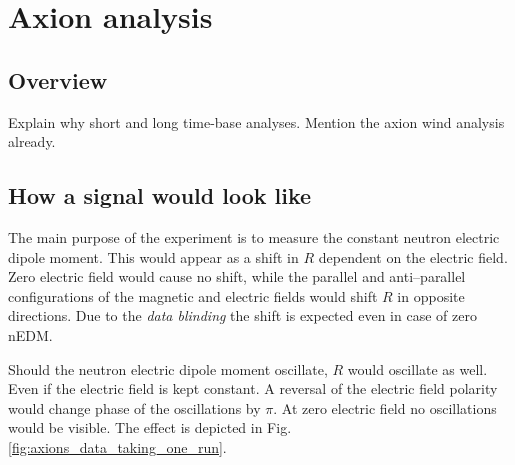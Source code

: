 \chapter{Axion analysis}
\label{ch:nedm-at-psi-apparatus}


\section{Overview}
Explain why short and long time-base analyses. Mention the axion wind analysis already.





\section{How a signal would look like}
The main purpose of the experiment is to measure the constant neutron electric dipole moment. This would appear as a shift in $R$ dependent on the electric field. Zero electric field would cause no shift, while the parallel and anti--parallel configurations of the magnetic and electric fields would shift $R$ in opposite directions. Due to the \emph{data blinding} the shift is expected even in case of zero nEDM.

Should the neutron electric dipole moment oscillate, $R$ would oscillate as well. Even if the electric field is kept constant. A reversal of the electric field polarity would change phase of the oscillations by $\pi$. At zero electric field no oscillations would be visible. The effect is depicted in Fig.\,\ref{fig:axions_data_taking_one_run}.

